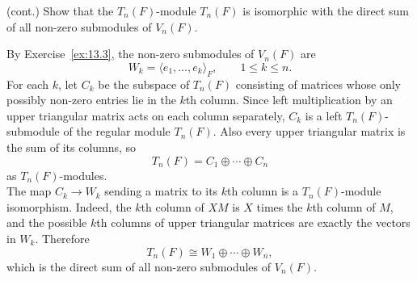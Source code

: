 \documentclass[../Odyssey_Project.tex]{subfiles}
\begin{document}
\begin{exercise}
\label{ex:13.4}
(cont.) Show that the $T_n(F)$-module $T_n(F)$ is isomorphic with the direct sum of all non-zero submodules of $V_n(F)$.
\end{exercise}
\begin{solution}
    By Exercise~\ref{ex:13.3}, the non-zero submodules of $V_n(F)$ are
    \[
        W_k=\langle e_1,\ldots,e_k\rangle_F,\qquad 1\leq k\leq n.
    \]
    For each $k$, let $C_k$ be the subspace of $T_n(F)$ consisting of matrices whose only possibly non-zero entries lie in the $k$th column. Since left multiplication by an upper triangular matrix acts on each column separately, $C_k$ is a left $T_n(F)$-submodule of the regular module $T_n(F)$. Also every upper triangular matrix is the sum of its columns, so
    \[
        T_n(F)=C_1\oplus\cdots\oplus C_n
    \]
    as $T_n(F)$-modules.\\
    The map $C_k\to W_k$ sending a matrix to its $k$th column is a $T_n(F)$-module isomorphism. Indeed, the $k$th column of $XM$ is $X$ times the $k$th column of $M$, and the possible $k$th columns of upper triangular matrices are exactly the vectors in $W_k$. Therefore
    \[
        T_n(F)\cong W_1\oplus\cdots\oplus W_n,
    \]
    which is the direct sum of all non-zero submodules of $V_n(F)$.
\end{solution}
\end{document}
